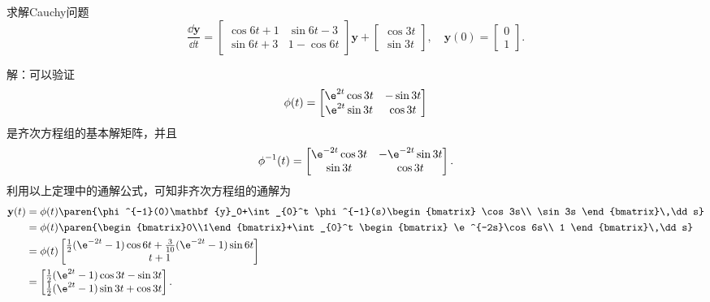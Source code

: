 \begin{example}
    求解Cauchy问题
    \begin{equation}
        \frac{\dd\mathbf{y}}{\dd t}=\begin{bmatrix}
        \cos 6t+1 & \sin 6t-3\\
        \sin 6t+3 & 1-\cos 6t
        \end{bmatrix}\mathbf{y}+\begin{bmatrix}
            \cos 3t\\
            \sin 3t
        \end{bmatrix},\quad \mathbf{y}(0)=\begin{bmatrix}
        0\\
        1
        \end{bmatrix}.
    \end{equation}

    解：可以验证
    \begin{equation}
        \phi(t)=\begin{bmatrix}
        \e^{2t}\cos 3t & -\sin 3t\\
        \e^{2t}\sin 3t & \cos 3t
        \end{bmatrix}
    \end{equation}
    是齐次方程组的基本解矩阵，并且
    \begin{equation}
        \phi^{-1}(t)=\begin{bmatrix}
        \e^{-2t}\cos 3t & -\e^{-2t}\sin 3t\\
        \sin 3t & \cos 3t
        \end{bmatrix}.
    \end{equation}
    利用以上定理中的通解公式，可知非齐次方程组的通解为
    \begin{align}
        \mathbf{y}(t)&=\phi(t)\paren{\phi^{-1}(0)\mathbf{y}_0+\int_{0}^t \phi^{-1}(s)\begin{bmatrix}
            \cos 3s\\
            \sin 3s
        \end{bmatrix}\,\dd s}\nonumber\\
        &=\phi(t)\paren{\begin{bmatrix}0\\1\end{bmatrix}+\int_{0}^t \begin{bmatrix}
            \e^{-2s}\cos 6s\\
            1
            \end{bmatrix}\,\dd s}\nonumber\\
        &=\phi(t)\begin{bmatrix}
            \frac{1}{2}(\e^{-2t}-1)\cos 6t+\frac{3}{10}(\e^{-2t}-1)\sin 6t\\
            t+1
            \end{bmatrix}\nonumber\\
        &=\begin{bmatrix}
            \frac{1}{2}(\e^{2t}-1)\cos 3t-\sin 3t\\
            \frac{1}{2}(\e^{2t}-1)\sin 3t+\cos 3t
        \end{bmatrix}.
    \end{align}
\end{example}

